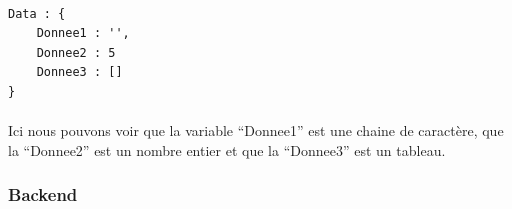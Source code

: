 \documentclass[12pt]{article}
\begin{document}
\paragraph{}
\begin{lstlisting}
Data : {
    Donnee1 : '',
    Donnee2 : 5
    Donnee3 : []
}

\end{lstlisting}

\paragraph{}
Ici nous pouvons voir que la variable “Donnee1” est une chaine de caractère, que la  “Donnee2” est un nombre entier et que la “Donnee3” est un tableau.


\subsubsection{Backend}
\end{document}
